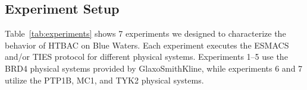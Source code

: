
 

\subsection{Experiment Setup}\label{ssec:exp_design}

Table~\ref{tab:experiments} shows 7 experiments we designed to characterize
the behavior of HTBAC on Blue Waters. Each experiment executes the ESMACS
and/or TIES protocol for different physical systems. Experiments 1--5 use the
BRD4 physical systems provided by GlaxoSmithKline, while experiments 6 and 7
utilize the PTP1B, MC1, and TYK2 physical systems. 


